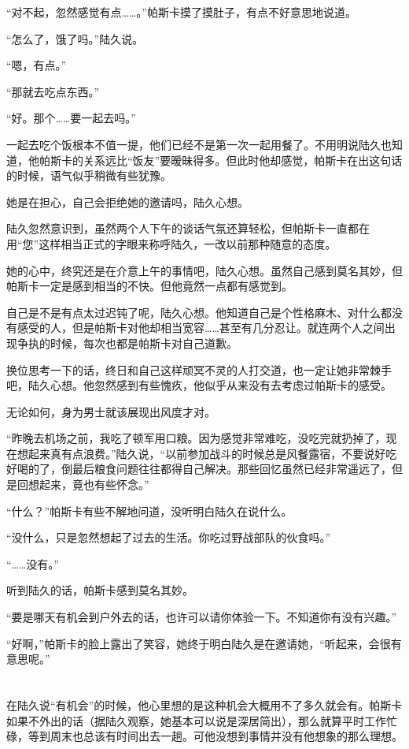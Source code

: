 “对不起，忽然感觉有点……。”帕斯卡摸了摸肚子，有点不好意思地说道。

“怎么了，饿了吗。”陆久说。

“嗯，有点。”

“那就去吃点东西。”

“好。那个……要一起去吗。”

一起去吃个饭根本不值一提，他们已经不是第一次一起用餐了。不用明说陆久也知道，他帕斯卡的关系远比“饭友”要暧昧得多。但此时他却感觉，帕斯卡在出这句话的时候，语气似乎稍微有些犹豫。

她是在担心，自己会拒绝她的邀请吗，陆久心想。

陆久忽然意识到，虽然两个人下午的谈话气氛还算轻松，但帕斯卡一直都在用“您”这样相当正式的字眼来称呼陆久，一改以前那种随意的态度。

她的心中，终究还是在介意上午的事情吧，陆久心想。虽然自己感到莫名其妙，但帕斯卡一定是感到相当的不快。但他竟然一点都有感觉到。

自己是不是有点太过迟钝了呢，陆久心想。他知道自己是个性格麻木、对什么都没有感受的人，但是帕斯卡对他却相当宽容……甚至有几分忍让。就连两个人之间出现争执的时候，每次也都是帕斯卡对自己道歉。

换位思考一下的话，终日和自己这样顽冥不灵的人打交道，也一定让她非常棘手吧，陆久心想。他忽然感到有些愧疚，他似乎从来没有去考虑过帕斯卡的感受。

无论如何，身为男士就该展现出风度才对。

“昨晚去机场之前，我吃了顿军用口粮。因为感觉非常难吃，没吃完就扔掉了，现在想起来真有点浪费。”陆久说，“以前参加战斗的时候总是风餐露宿，不要说好吃好喝的了，倒最后粮食问题往往都得自己解决。那些回忆虽然已经非常遥远了，但是回想起来，竟也有些怀念。”

“什么？”帕斯卡有些不解地问道，没听明白陆久在说什么。

“没什么，只是忽然想起了过去的生活。你吃过野战部队的伙食吗。” 

“……没有。”

听到陆久的话，帕斯卡感到莫名其妙。

“要是哪天有机会到户外去的话，也许可以请你体验一下。不知道你有没有兴趣。”

“好啊，”帕斯卡的脸上露出了笑容，她终于明白陆久是在邀请她，“听起来，会很有意思呢。”\section*{}

在陆久说“有机会”的时候，他心里想的是这种机会大概用不了多久就会有。帕斯卡如果不外出的话（据陆久观察，她基本可以说是深居简出），那么就算平时工作忙碌，等到周末也总该有时间出去一趟。可他没想到事情并没有他想象的那么理想。

